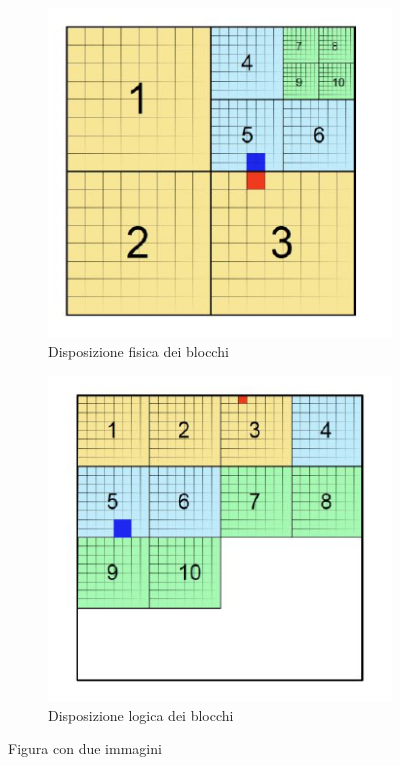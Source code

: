 \begin{figure}[ht]
	\centering
	\begin{subfigure}{0.3\textwidth}
		\includegraphics[width=1.0\textwidth]{Immagini/disoposizione_blocchi_fisica.png}
		\caption{Disposizione fisica dei blocchi}
	\end{subfigure}%
	\begin{subfigure}{0.3\textwidth}
		\includegraphics[width=1.0\textwidth]{Immagini/disoposizione_blocchi_logica.png}
		\caption{Disposizione logica dei blocchi}
	\end{subfigure}
	\caption{Figura con due immagini}
	\label{fig:two}
\end{figure}


